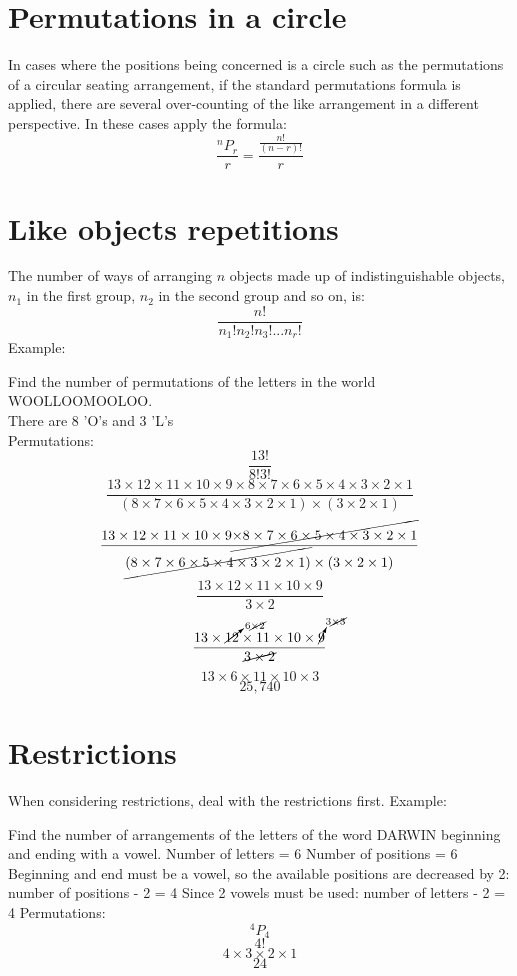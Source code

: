 \documentclass{book}
\begin{document}
\section{Permutations in a circle}
In cases where the positions being concerned is a circle such as the permutations of a circular seating arrangement, if the standard permutations formula is applied, there are several over-counting of the like arrangement in a different perspective.  In these cases apply the formula:
\[
	\frac{^nP_r}{r} = \frac{\frac{n!}{(n-r)!}}{r}
\]

\section{Like objects repetitions}
The number of ways of arranging $n$ objects made up of indistinguishable objects, $n_1$ in the first group, $n_2$ in the second group and so on, is:
\[
	\frac{n!}{n_1! n_2! n_3!... n_r!}
\]
Example:
\begin{center}
	Find the number of permutations of the letters in the world WOOLLOOMOOLOO.\\
	There are 8 'O's and 3 'L's\\
	Permutations:
	\[\frac{13!}{8!3!}\]
	\[\frac{13 \times 12 \times 11 \times 10 \times 9 \times 8 \times 7 \times 6 \times 5 \times 4 \times 3 \times 2 \times 1}{(8 \times 7 \times 6 \times 5 \times 4 \times 3 \times 2 \times 1) \times (3 \times 2 \times 1)}\]
	\[\frac{13 \times 12 \times 11 \times 10 \times 9 \cancel{\times 8 \times 7 \times 6 \times 5 \times 4 \times 3 \times 2 \times 1}}{\cancel{(8 \times 7 \times 6 \times 5 \times 4 \times 3 \times 2 \times 1)} \times (3 \times 2 \times 1)}\]
	\[\frac{13 \times 12 \times 11 \times 10 \times 9}{3 \times 2}\]
	\[\frac{13 \times \cancelto{6 \cancel{\times 2}}{12} \times 11 \times 10 \times \cancelto{3 \cancel{\times 3}}{9}}{\cancel{3 \times 2}}\]
	\[13 \times 6 \times 11 \times 10 \times 3\]
	\[25,740\]
\end{center}

\section{Restrictions}
When considering restrictions, deal with the restrictions first.
Example:
\begin{center}
	Find the number of arrangements of the letters of the word DARWIN beginning and ending with a vowel.
	Number of letters = 6
	Number of positions = 6
	Beginning and end must be a vowel, so the available positions are decreased by 2: number of positions - 2 = 4
	Since 2 vowels must be used:  number of letters - 2 = 4
	Permutations:
	\[^4P_4\]
	\[4!\]
	\[4 \times 3 \times 2 \times 1\]
	\[24\]
\end{center}
\end{document}
